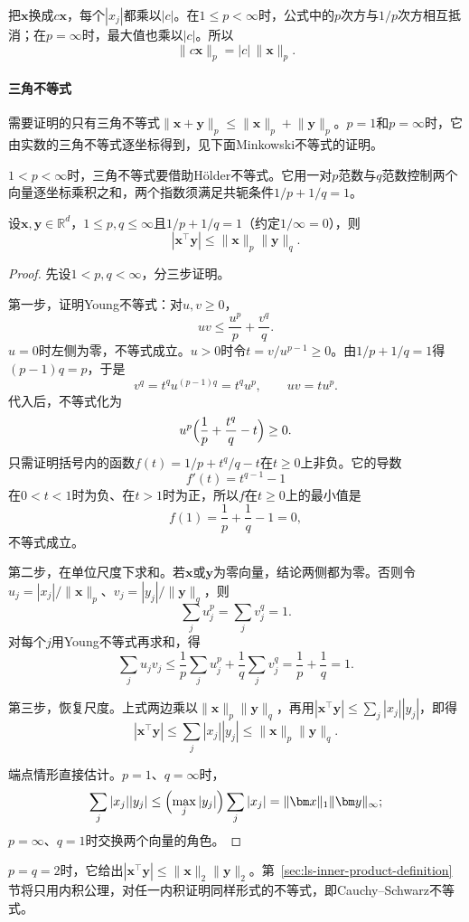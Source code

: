 把$\bm x$换成$c\bm x$，每个$|x_j|$都乘以$|c|$。在$1\leq p<\infty$时，公式中的$p$次方与$1/p$次方相互抵消；在$p=\infty$时，最大值也乘以$|c|$。所以
\[
 \lVert c\bm x\rVert_p=|c|\,\lVert\bm x\rVert_p.
\]

\paragraph{三角不等式}
需要证明的只有三角不等式$\lVert\bm x+\bm y\rVert_p\leq\lVert\bm x\rVert_p+\lVert\bm y\rVert_p$。$p=1$和$p=\infty$时，它由实数的三角不等式逐坐标得到，见下面Minkowski不等式的证明。

$1<p<\infty$时，三角不等式要借助Hölder不等式。它用一对$p$范数与$q$范数控制两个向量逐坐标乘积之和，两个指数须满足共轭条件$1/p+1/q=1$。
\begin{theorem}[有限维Hölder不等式]
\label{thm:linear-algebra-holder}
设$\bm x,\bm y\in\mathbb R^d$，$1\leq p,q\leq\infty$且$1/p+1/q=1$（约定$1/\infty=0$），则
\begin{equation}
 |\bm x^\top\bm y|\leq\lVert\bm x\rVert_p\lVert\bm y\rVert_q.
 \label{eq:linear-algebra-holder}
\end{equation}
\end{theorem}
\begin{proof}
先设$1<p,q<\infty$，分三步证明。

第一步，证明Young不等式：对$u,v\geq0$，
\[
 uv\leq\frac{u^p}{p}+\frac{v^q}{q}.
\]
$u=0$时左侧为零，不等式成立。$u>0$时令$t=v/u^{p-1}\geq0$。由$1/p+1/q=1$得$(p-1)q=p$，于是
\[
 v^q=t^qu^{(p-1)q}=t^qu^p,\qquad uv=tu^p.
\]
代入后，不等式化为
\[
 u^p\Bigl(\frac1p+\frac{t^q}{q}-t\Bigr)\geq0.
\]
只需证明括号内的函数$f(t)=1/p+t^q/q-t$在$t\geq0$上非负。它的导数
\[
 f'(t)=t^{q-1}-1
\]
在$0<t<1$时为负、在$t>1$时为正，所以$f$在$t\geq0$上的最小值是
\[
 f(1)=\frac1p+\frac1q-1=0,
\]
不等式成立。

第二步，在单位尺度下求和。若$\bm x$或$\bm y$为零向量，结论两侧都为零。否则令$u_j=|x_j|/\lVert\bm x\rVert_p$、$v_j=|y_j|/\lVert\bm y\rVert_q$，则
\[
 \sum_ju_j^p=\sum_jv_j^q=1.
\]
对每个$j$用Young不等式再求和，得
\[
 \sum_ju_jv_j\leq\frac1p\sum_ju_j^p+\frac1q\sum_jv_j^q=\frac1p+\frac1q=1.
\]

第三步，恢复尺度。上式两边乘以$\lVert\bm x\rVert_p\lVert\bm y\rVert_q$，再用$|\bm x^\top\bm y|\leq\sum_j|x_j||y_j|$，即得
\[
 |\bm x^\top\bm y|\leq\sum_j|x_j||y_j|\leq\lVert\bm x\rVert_p\lVert\bm y\rVert_q.
\]

端点情形直接估计。$p=1$、$q=\infty$时，
\[
 \sum_j|x_j||y_j|\leq\Bigl(\max_j|y_j|\Bigr)\sum_j|x_j|=\lVert\bm x\rVert_1\lVert\bm y\rVert_\infty;
\]
$p=\infty$、$q=1$时交换两个向量的角色。
\end{proof}
$p=q=2$时，它给出$|\bm x^\top\bm y|\leq\lVert\bm x\rVert_2\lVert\bm y\rVert_2$。第~\ref{sec:ls-inner-product-definition}节将只用内积公理，对任一内积证明同样形式的不等式，即Cauchy--Schwarz不等式。

